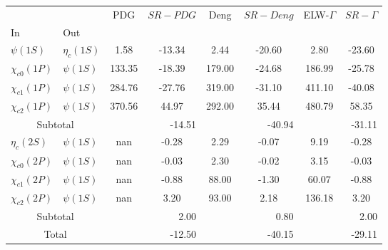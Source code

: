 \begin{tabular}{|l|l|c|c|c|c|c|c|}%
\hline%
&&PDG&$SR-PDG$&Deng&$SR-Deng$&ELW-$\Gamma$&$SR-\Gamma$\\%
In&Out&&&&&&\\%
\hline%
$\psi(1S)$&$\eta_{c}(1S)$&1.58&-13.34&2.44&-20.60&2.80&-23.60\\%
$\chi_{c0}(1P)$&$\psi(1S)$&133.35&-18.39&179.00&-24.68&186.99&-25.78\\%
$\chi_{c1}(1P)$&$\psi(1S)$&284.76&-27.76&319.00&-31.10&411.10&-40.08\\%
$\chi_{c2}(1P)$&$\psi(1S)$&370.56&44.97&292.00&35.44&480.79&58.35\\%
\hline%
\hline%
\multicolumn{2}{|c|}{Subtotal}&\multicolumn{2}{|r|}{{-}14.51}&\multicolumn{2}{|r|}{{-}40.94}&\multicolumn{2}{|r|}{{-}31.11}\\%
\hline%
\hline%
$\eta_{c}(2S)$&$\psi(1S)$&nan&-0.28&2.29&-0.07&9.19&-0.28\\%
$\chi_{c0}(2P)$&$\psi(1S)$&nan&-0.03&2.30&-0.02&3.15&-0.03\\%
$\chi_{c1}(2P)$&$\psi(1S)$&nan&-0.88&88.00&-1.30&60.07&-0.88\\%
$\chi_{c2}(2P)$&$\psi(1S)$&nan&3.20&93.00&2.18&136.18&3.20\\%
\hline%
\hline%
\multicolumn{2}{|c|}{Subtotal}&\multicolumn{2}{|r|}{2.00}&\multicolumn{2}{|r|}{0.80}&\multicolumn{2}{|r|}{2.00}\\%
\hline%
\hline%
\multicolumn{2}{|c|}{Total}&\multicolumn{2}{|r|}{{-}12.50}&\multicolumn{2}{|r|}{{-}40.15}&\multicolumn{2}{|r|}{{-}29.11}\\%
\hline%
\end{tabular}